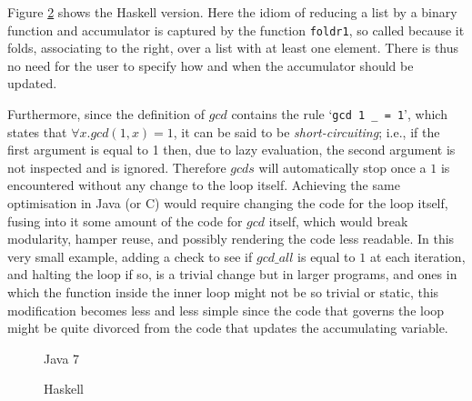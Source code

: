 Figure \ref{fig:gcds:haskell} shows the Haskell version. Here the idiom
of reducing a list by a binary function and accumulator is captured
by the function \lstinline|foldr1|, so called because it folds,
associating to the right, over a list with at least one element. There is thus no 
need for the user to specify how and when the accumulator should be updated.

Furthermore, since the definition of $gcd$ contains the rule
`\lstinline|gcd 1 _ = 1|',
which states that $\forall x. gcd (1, x) = 1$, it can be said to be
\emph{short-circuiting}; i.e., if the first argument is equal to 1 then, due
to lazy evaluation, the second argument is not inspected and is ignored.
Therefore $gcds$ will automatically stop once a $1$ is encountered without any
change to the loop itself. Achieving the same optimisation in Java (or C) would
require changing the code for the loop itself, fusing into it some amount of the code
for $gcd$ itself, which would break
modularity, hamper reuse, and possibly rendering the code less readable. In this very small example, adding a check to see if $gcd\_all$ is equal to $1$ at each 
iteration, and halting the loop if so, is a trivial change but in larger programs, and ones in which the function inside the inner loop might not be so trivial or static,
this modification becomes less and less simple since the code that governs the loop might be
quite divorced from the code that updates the accumulating variable.

\begin{figure}

\caption{Java 7}
\label{fig:gcds:java}
\end{figure}

%

\begin{figure}

\caption{Haskell}
\label{fig:gcds:haskell}
\end{figure}
